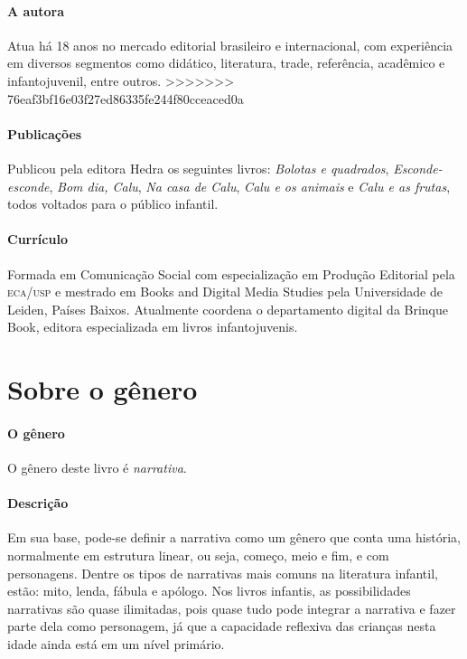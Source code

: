 \documentclass[11pt]{extarticle}
\begin{document}
\paragraph{A autora}
Atua há 18 anos no 
mercado editorial brasileiro e internacional, com experiência 
em diversos segmentos como didático, literatura, trade, 
referência, acadêmico e infantojuvenil, entre outros. 
>>>>>>> 76eaf3bf16e03f27ed86335fe244f80cceaced0a

\paragraph{Publicações}
Publicou pela editora Hedra os seguintes livros: \emph{Bolotas e quadrados},
\emph{Esconde-esconde}, \emph{Bom dia, Calu}, \emph{Na casa de Calu}, \emph{Calu e os animais} e
\emph{Calu e as frutas}, todos voltados para o público infantil.

\paragraph{Currículo} 
Formada em Comunicação Social com 
especialização em Produção Editorial pela \textsc{eca/usp} 
e mestrado em Books and Digital Media Studies pela 
Universidade de Leiden, Países Baixos.
Atualmente coordena o departamento digital da Brinque 
Book, editora especializada em livros infantojuvenis.


\section{Sobre o gênero}

\paragraph{O gênero} O gênero deste livro é \textit{narrativa}. 


\paragraph{Descrição} Em sua base, pode-se definir a narrativa como um gênero que conta uma história, normalmente em estrutura linear, ou seja, começo, meio e fim, e com personagens. 
Dentre os tipos de narrativas mais comuns na literatura infantil, estão: mito, lenda, 
fábula e apólogo. Nos livros infantis, as possibilidades narrativas são quase ilimitadas, pois quase tudo pode integrar a narrativa e fazer parte dela como personagem, já que a capacidade reflexiva das crianças nesta idade ainda está em um nível primário. 
\end{document}

